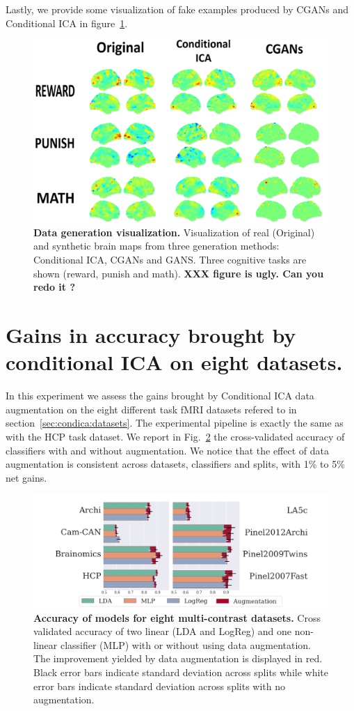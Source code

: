 Lastly, we provide some visualization of fake examples produced by CGANs and Conditional ICA in figure~\ref{sec:visualization:fig}.
\begin{figure}
  \centerline{\includegraphics[width=0.8\linewidth]{figures/condica/fake_real_viz_v3_redim_improved2.png}}
  \caption{\textbf{Data generation visualization.} Visualization of real
    (Original) and synthetic brain maps from three generation methods:
    Conditional ICA, CGANs and GANS. Three cognitive tasks are shown (reward, punish and math).
    \textbf{XXX figure is ugly. Can you redo it ?}
  }
  \label{sec:visualization:fig}
\end{figure}






\section{Gains in accuracy brought by conditional ICA on eight datasets.}
In this experiment we assess the gains brought by Conditional ICA data
augmentation on the eight different task fMRI datasets refered to in section~\ref{sec:condica:datasets}. The experimental pipeline is exactly the same as with the HCP task dataset.
We report in Fig.~\ref{Fig4} the cross-validated accuracy of
classifiers with and without augmentation.
We notice that the effect of data augmentation is
consistent across datasets, classifiers and splits, with 1\% to 5\% net gains.
%
\begin{figure}
  \centering
  \includegraphics[width=\textwidth]{figures/condica/accuracy_all_datasets_v5.png}
\caption{\textbf{Accuracy of models for eight multi-contrast datasets.} Cross
  validated accuracy of two linear (LDA and LogReg) and one non-linear
  classifier (MLP) with or without using data augmentation.
  The improvement yielded by data augmentation is displayed in red.
  Black error bars indicate standard deviation across splits while white error bars indicate standard deviation across splits with no augmentation.}
\label{Fig4}
\end{figure}
%

